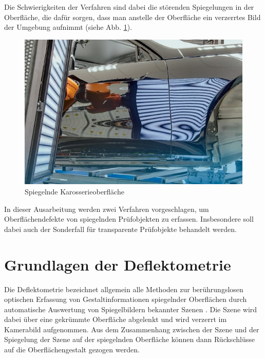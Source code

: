 \documentclass[ngerman,11pt,twocolumn,a4paper]{article}
\begin{document}
	\par
	Die Schwierigkeiten der Verfahren sind dabei die störenden Spiegelungen in der Oberfläche, die dafür sorgen, dass man anstelle der Oberfläche ein verzerrtes Bild der Umgebung aufnimmt (siehe Abb. \ref{img:spiegelndeKarosserie}).
	\begin{figure}[H]
		\centering
		\includegraphics[width=0.75\columnwidth]{spiegelndeKarosserie}
		\caption{Spiegelnde Karosserieoberfläche \cite{spiegelndeKarosserieImg}}
		\label{img:spiegelndeKarosserie}
	\end{figure}	
	
	In dieser Ausarbeitung werden zwei Verfahren vorgeschlagen, um Oberflächendefekte von spiegelnden Prüfobjekten zu erfassen.
	Insbesondere soll dabei auch der Sonderfall für transparente Prüfobjekte behandelt werden.
	
	\section{Grundlagen der Deflektometrie} \label{sec:grundlagenDerDeflektometrie}
	Die Deflektometrie bezeichnet allgemein alle Methoden zur berührungslosen optischen Erfassung von Gestaltinformationen spiegelnder Oberflächen durch automatische Auswertung von Spiegelbildern bekannter Szenen \cite{fraunhofer}.
	Die Szene wird dabei über eine gekrümmte Oberfläche abgelenkt und wird verzerrt im Kamerabild aufgenommen.
	Aus dem Zusammenhang zwischen der Szene und der Spiegelung der Szene auf der spiegelnden Oberfläche können dann Rückschlüsse auf die Oberflächengestalt gezogen werden.
	
\end{document}

